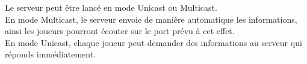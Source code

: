 \par
Le serveur peut être lancé en mode Unicast ou Multicast.\\
En mode Multicast, le serveur envoie de manière automatique les informations, ainsi les joueurs pourront écouter sur le port prévu à cet effet.\\
En mode Unicast, chaque joueur peut demander des informations au serveur qui réponds immédiatement.